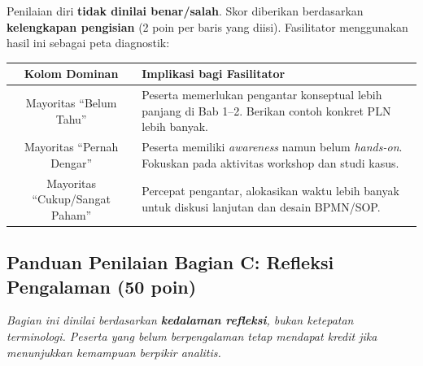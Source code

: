 \documentclass[12pt,a4paper]{report}
\begin{document}
\begin{plnbox}
\small
Penilaian diri \textbf{tidak dinilai benar/salah}. Skor diberikan berdasarkan \textbf{kelengkapan pengisian} (2 poin per baris yang diisi). Fasilitator menggunakan hasil ini sebagai peta diagnostik:

\vspace{0.3cm}
\renewcommand{\arraystretch}{1.3}
\begin{tabularx}{\textwidth}{@{} c X @{}}
\toprule
\textbf{Kolom Dominan} & \textbf{Implikasi bagi Fasilitator} \\
\midrule
Mayoritas ``Belum Tahu'' & Peserta memerlukan pengantar konseptual lebih panjang di Bab 1--2. Berikan contoh konkret PLN lebih banyak. \\
Mayoritas ``Pernah Dengar'' & Peserta memiliki \textit{awareness} namun belum \textit{hands-on}. Fokuskan pada aktivitas workshop dan studi kasus. \\
Mayoritas ``Cukup/Sangat Paham'' & Percepat pengantar, alokasikan waktu lebih banyak untuk diskusi lanjutan dan desain BPMN/SOP. \\
\bottomrule
\end{tabularx}
\renewcommand{\arraystretch}{1.0}
\end{plnbox}

\subsection{Panduan Penilaian Bagian C: Refleksi Pengalaman (50 poin)}

\textit{Bagian ini dinilai berdasarkan \textbf{kedalaman refleksi}, bukan ketepatan terminologi. Peserta yang belum berpengalaman tetap mendapat kredit jika menunjukkan kemampuan berpikir analitis.}

\vspace{0.3cm}
\end{document}
